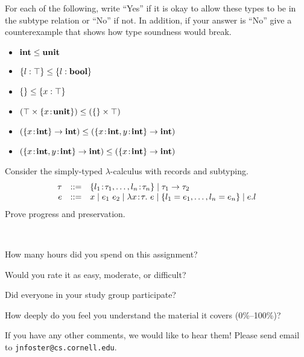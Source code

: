 \documentclass[10pt]{article}
\begin{document}
\begin{exercise}
  For each of the following, write ``Yes'' if it is okay to allow
  these types to be in the subtype relation or ``No'' if not. In
  addition, if your answer is ``No'' give a counterexample that shows
  how type soundness would break.
\begin{itemize}
\item $\mathsf{\textbf{int}} \leq \mathsf{\textbf{unit}}$
\item $\{ l : \top \} \leq \{ l : \mathsf{\textbf{bool}} \}$
\item $\{ \} \leq \{ x : \top \}$ 
\item $(\top \times \{ x \!:\! \mathsf{\textbf{unit}} \}) \leq (\{\} \times \top)$
\item $(\{ x \!:\! \mathsf{\textbf{int}} \} \rightarrow \mathsf{\textbf{int}}) \leq (\{ x \!:\! \mathsf{\textbf{int}}, y \!:\! \mathsf{\textbf{int}} \} \rightarrow \mathsf{\textbf{int}})$
\item $(\{ x \!:\! \mathsf{\textbf{int}}, y \!:\! \mathsf{\textbf{int}} \} \rightarrow \mathsf{\textbf{int}}) \leq (\{ x \!:\! \mathsf{\textbf{int}} \} \rightarrow \mathsf{\textbf{int}})$
\end{itemize}
\end{exercise}

\begin{exercise}
  Consider the simply-typed $\lambda$-calculus with records and
  subtyping.
%
\[
\begin{array}{rcl}
\tau & ::= & \{ l_1 \!:\! \tau_1, \dots, l_n \!:\! \tau_n \} \mid \tau_1 \rightarrow \tau_2\\
e    & ::= & x \mid e_1~e_2 \mid \lambda x \!:\!\tau .~ e \mid \{ l_1 = e_1 , \dots, l_n = e_n \} \mid e.l\\
\end{array}
\]
%
Prove progress and preservation. 
\end{exercise}

\begin{debriefing} \hfill\\[-4ex]
\begin{enumerate*}
\item How many hours did you spend on this assignment? 
\item Would you rate it as easy, moderate, or difficult? 
\item Did everyone in your study group participate? 
\item How deeply do you feel you understand the material it covers (0\%--100\%)? 
\item If you have any other comments, we would like to hear them!
  Please send email to \texttt{jnfoster@cs.cornell.edu}.
\end{enumerate*}
\end{debriefing}
\end{document}
